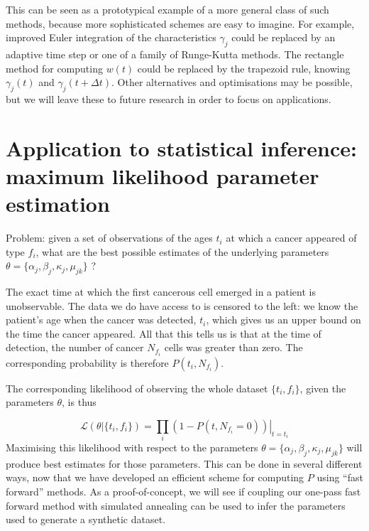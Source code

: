 \documentclass{article}
\begin{document}
This can be seen as a prototypical example of a more general class of such
methods, because more sophisticated schemes are easy to imagine. For example, improved Euler integration
of the characteristics $\gamma_j$ could be replaced by an adaptive time step or
one of a family of Runge-Kutta methods. The rectangle method for computing $w(t)$
could be replaced by the trapezoid rule, knowing $\gamma_j(t)$ and $\gamma_j(t +
\Delta t)$. Other alternatives and optimisations may be possible, but we will
leave these to future research in order to focus on applications.

\section{Application to statistical inference: maximum likelihood parameter estimation}

Problem: given a set of observations of the ages $t_i$ at which a cancer
appeared of type $f_i$, what are the best possible estimates of the underlying
parameters $\theta = \{\alpha_j, \beta_j, \kappa_j, \mu_{jk}\}$ ?

The exact time at which the first cancerous cell emerged in a patient is
unobservable. The data we do have access to is censored to the left:
we know the patient's age when the cancer was detected, $t_i$, which gives us an
upper bound on the time the cancer appeared. All that this tells us is that at
the time of detection, the number of cancer $N_{f_i}$ cells was greater than
zero. The corresponding probability is therefore $P(t_i, N_{f_i})$.

The corresponding likelihood of observing the whole dataset $\{t_i,f_i\}$, given
the parameters $\theta$, is thus


\begin{equation}
    \mathcal{L}(\theta | \{t_i, f_i\}) = \prod_i 
    \left. (1 - P(t, N_{f_i} = 0)) \right|_{t=t_i}
\end{equation}
Maximising this likelihood with respect to the parameters
$\theta = \{\alpha_j, \beta_j, \kappa_j, \mu_{jk}\}$ will produce best estimates
for those parameters.
This can be done in several different ways, now that we have developed an efficient scheme
for computing $P$ using ``fast forward'' methods. As a proof-of-concept, we will
see if coupling our one-pass fast forward method with simulated annealing can be
used to infer the parameters used to generate a synthetic dataset.
\end{document}

